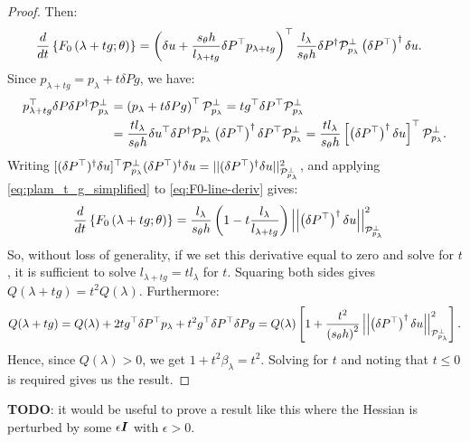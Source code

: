\documentclass[eikonal.tex]{subfiles}
\begin{document}
\begin{proof}
  Then:
  \begin{align}\label{eq:F0-line-deriv}
    \frac{d}{dt} \left\{F_0\left(\lambda + t g; \theta\right)\right\} &= \left(\delta u + \frac{s_\theta h}{l_{\lambda + t g}} \delta P^\top p_{\lambda + t g}\right)^\top \frac{l_\lambda}{s_\theta h} \delta P^\dagger \mathcal{P}^\perp_{p_\lambda} \left(\delta P^\top\right)^\dagger \delta u.
  \end{align}
  Since $p_{\lambda + tg} = p_\lambda + t \delta P g$, we have:
  \begin{align}\label{eq:plam_t_g_simplified}
    p_{\lambda + t g}^\top \delta P \delta P^\dagger \mathcal{P}^\perp_{p_\lambda} &= \left(p_\lambda + t \delta P g\right)^\top \mathcal{P}^\perp_{p_\lambda} = t g^\top \delta P^\top \mathcal{P}^\perp_{p_\lambda} \\
                                                                                   &= \frac{t l_\lambda}{s_\theta h} \delta u^\top \delta P^\dagger \mathcal{P}^\perp_{p_\lambda} \left(\delta P^\top\right)^\dagger \delta P^\top \mathcal{P}^\perp_{p_\lambda} = \frac{t l_\lambda}{s_\theta h} \left[\left(\delta P^\top\right)^\dagger \delta u\right]^\top \mathcal{P}^\perp_{p_\lambda}.
  \end{align}
  Writing
  $[(\delta P^\top)^\dagger \delta u]^\top \mathcal{P}^\perp_{p_\lambda}
  (\delta P^\top)^\dagger \delta u = ||(\delta P^\top)^\dagger \delta
  u||^2_{\mathcal{P}^\perp_{p_\lambda}}$, and applying
  \cref{eq:plam_t_g_simplified} to \cref{eq:F0-line-deriv} gives:
  \begin{align*}
    \frac{d}{dt} \left\{F_0\left(\lambda + t g; \theta\right)\right\} &= \frac{l_\lambda}{s_\theta h} \left(1 - t \frac{l_\lambda}{l_{\lambda + t g}}\right) \left|\left|\left(\delta P^\top\right)^\dagger \delta u\right|\right|^2_{\mathcal{P}^\perp_{p_\lambda}}
  \end{align*}
  So, without loss of generality, if we set this derivative equal to
  zero and solve for $t$, it is sufficient to solve
  $l_{\lambda + t g} = t l_\lambda$ for $t$. Squaring both sides gives
  $Q(\lambda + t g) = t^2 Q(\lambda)$. Furthermore:
  \begin{align*}
    Q(\lambda + tg) = Q(\lambda) + 2tg^\top \delta P^\top p_\lambda + t^2 g^\top \delta P^\top \delta P g = Q(\lambda) \left[1 + \frac{t^2}{{(s_\theta h)}^2} \left|\left|\left(\delta P^\top\right)^\dagger \delta u\right|\right|^2_{\mathcal{P}^\perp_{p_\lambda}}\right].
  \end{align*}
  Hence, since $Q(\lambda) > 0$, we get $1 + t^2 \beta_\lambda =
  t^2$. Solving for $t$ and noting that $t \leq 0$ is required gives
  us the result.
\end{proof}

\textbf{TODO}: it would be useful to prove a result like this where
the Hessian is perturbed by some $\epsilon \boldsymbol{I}$ with $\epsilon > 0$.
\end{document}
